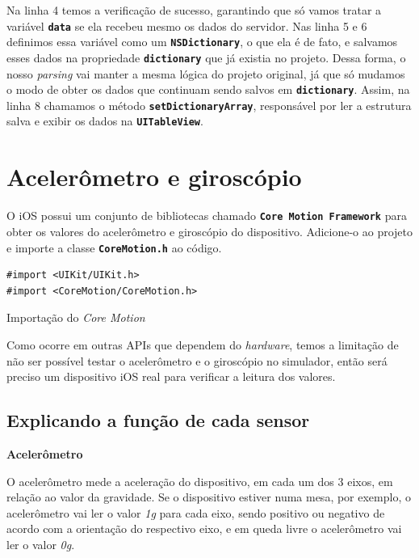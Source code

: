 \documentclass[a4paper,12pt,brazil,doubleside]{book}
\begin{document}
\begin{singlespace}
Na linha 4 temos a verificação de sucesso, garantindo que só vamos tratar a variável \texttt{\textbf{data}} se ela recebeu mesmo os dados do servidor. Nas linha 5 e 6 definimos essa variável como um \texttt{\textbf{NSDictionary}}, o que ela é de fato, e salvamos esses dados na propriedade \texttt{\textbf{dictionary}} que já existia no projeto. Dessa forma, o nosso \emph{parsing} vai manter a mesma lógica do projeto original, já que só mudamos o modo de obter os dados que continuam sendo salvos em \texttt{\textbf{dictionary}}. Assim, na linha 8 chamamos o método \texttt{\textbf{setDictionaryArray}}, responsável por ler a estrutura salva e exibir os dados na \texttt{\textbf{UITableView}}.

\bigskip

\section{Acelerômetro e giroscópio}


O iOS possui um conjunto de bibliotecas chamado \texttt{\textbf{Core Motion Framework}} para obter os valores do acelerômetro e giroscópio do dispositivo. Adicione-o ao projeto e importe a classe \texttt{\textbf{CoreMotion.h}} ao código.

\begin{listing}[H]
\begin{verbatim}
#import <UIKit/UIKit.h>
#import <CoreMotion/CoreMotion.h>
\end{verbatim}
\caption{Importação do \emph{Core Motion}}
\end{listing}


Como ocorre em outras APIs que dependem do \emph{hardware}, temos a limitação de não ser possível testar o acelerômetro e o giroscópio no simulador, então será preciso um dispositivo iOS real para verificar a leitura dos valores.

\bigskip

\subsection{Explicando a função de cada sensor}


\textbf{Acelerômetro}


O acelerômetro mede a aceleração do dispositivo, em cada um dos 3 eixos, em relação ao valor da gravidade. Se o dispositivo estiver numa mesa, por exemplo, o acelerômetro vai ler o valor \emph{1g} para cada eixo, sendo positivo ou negativo de acordo com a orientação do respectivo eixo, e em queda livre o acelerômetro vai ler o valor \emph{0g}.


\end{singlespace}
\end{document}
